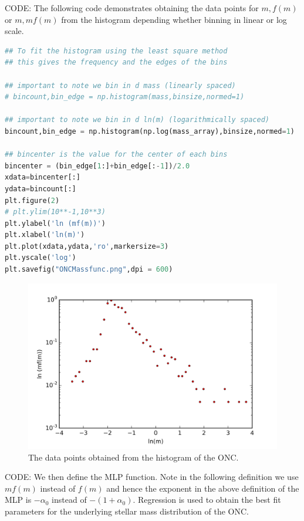 \documentclass{article}
\begin{document}
CODE: The following code demonstrates obtaining the data points for $m, f(m)$ or $m, mf(m)$ from the histogram depending whether binning in linear or log scale. 

\begin{lstlisting}[language=Python, caption=Python example]
## To fit the histogram using the least square method
## this gives the frequency and the edges of the bins

## important to note we bin in d mass (linearly spaced)
# bincount,bin_edge = np.histogram(mass,binsize,normed=1) 

## important to note we bin in d ln(m) (logarithmically spaced)
bincount,bin_edge = np.histogram(np.log(mass_array),binsize,normed=1) 

## bincenter is the value for the center of each bins
bincenter = (bin_edge[1:]+bin_edge[:-1])/2.0
xdata=bincenter[:]
ydata=bincount[:]
plt.figure(2)
# plt.ylim(10**-1,10**3)
plt.ylabel('ln (mf(m))')
plt.xlabel('ln(m)')
plt.plot(xdata,ydata,'ro',markersize=3)
plt.yscale('log')
plt.savefig("ONCMassfunc.png",dpi = 600)
\end{lstlisting}


     \begin{figure}
	\centering
        \includegraphics[]{ONCmassfunc.png}
	\caption{The data points obtained from the histogram of the ONC.}
      \end{figure}

CODE: We then define the MLP function. Note in the following definition we use $mf(m)$ instead of $f(m)$ and hence the exponent in the above definition of the MLP is $-\alpha_0$ instead of $-(1+\alpha_0)$. Regression is used to obtain the best fit parameters for the underlying stellar mass distribution of the ONC. 
\end{document}
